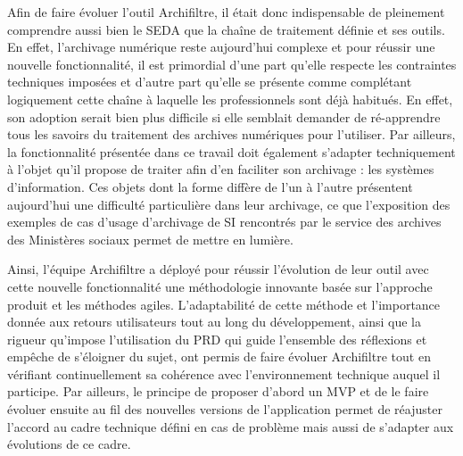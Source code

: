 \documentclass[a4paper,12pt,twoside]{book}
\begin{document}
	
	Afin de faire évoluer l’outil \gls{Archifiltre}, il était donc indispensable de pleinement comprendre aussi bien le \gls{SEDA} que la chaîne de traitement définie et ses outils. En effet, l’archivage numérique reste aujourd’hui complexe et pour réussir une nouvelle fonctionnalité, il est primordial d’une part qu’elle respecte les contraintes techniques imposées et d’autre part qu’elle se présente comme complétant logiquement cette chaîne à laquelle les professionnels sont déjà habitués. En effet, son adoption serait bien plus difficile si elle semblait demander de ré-apprendre tous les savoirs du traitement des archives numériques pour l’utiliser. Par ailleurs, la fonctionnalité présentée dans ce travail doit également s’adapter techniquement à l’objet qu’il propose de traiter afin d’en faciliter son archivage : les systèmes d’information. Ces objets dont la forme diffère de l’un à l’autre présentent aujourd’hui une difficulté particulière dans leur archivage, ce que l'exposition des exemples de cas d’usage d’archivage de SI rencontrés par le service des archives des Ministères sociaux permet de mettre en lumière.
	
	
	Ainsi, l’équipe \gls{Archifiltre} a déployé pour réussir l’évolution de leur outil avec cette nouvelle fonctionnalité une méthodologie innovante basée sur l’approche produit et les méthodes agiles. L’adaptabilité de cette méthode et l’importance donnée aux retours utilisateurs tout au long du développement, ainsi que la rigueur qu’impose l’utilisation du \gls{PRD} qui guide l’ensemble des réflexions et empêche de s’éloigner du sujet, ont permis de faire évoluer \gls{Archifiltre} tout en vérifiant continuellement sa cohérence avec l’environnement technique auquel il participe. Par ailleurs, le principe de proposer d’abord un \gls{MVP} et de le faire évoluer ensuite au fil des nouvelles versions de l'application permet de réajuster l’accord au cadre technique défini en cas de problème mais aussi de s’adapter aux évolutions de ce cadre.
	
\end{document}
